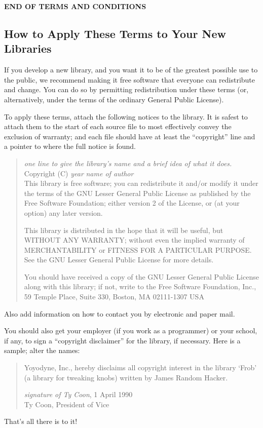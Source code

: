 \begin{center}\textbf{END OF TERMS AND CONDITIONS}\end{center}

\subsection*{How to Apply These Terms to Your New Libraries}

  If you develop a new library, and you want it to be of the greatest
possible use to the public, we recommend making it free software that
everyone can redistribute and change.  You can do so by permitting
redistribution under these terms (or, alternatively, under the terms of the
ordinary General Public License).

  To apply these terms, attach the following notices to the library.  It is
safest to attach them to the start of each source file to most effectively
convey the exclusion of warranty; and each file should have at least the
``copyright'' line and a pointer to where the full notice is found.

\begin{quote}
{\em one line to give the library's name and a brief idea of what it does.}\\
Copyright (C) {\em year} {\em name of author}\\

    This library is free software; you can redistribute it and/or
    modify it under the terms of the GNU Lesser General Public
    License as published by the Free Software Foundation; either
    version 2 of the License, or (at your option) any later version.

    This library is distributed in the hope that it will be useful,
    but WITHOUT ANY WARRANTY; without even the implied warranty of
    MERCHANTABILITY or FITNESS FOR A PARTICULAR PURPOSE\@.  See the GNU
    Lesser General Public License for more details.

    You should have received a copy of the GNU Lesser General Public
    License along with this library; if not, write to the Free Software
    Foundation, Inc., 59 Temple Place, Suite 330, Boston, MA  02111-1307  USA
\end{quote}

Also add information on how to contact you by electronic and paper mail.

You should also get your employer (if you work as a programmer) or your
school, if any, to sign a ``copyright disclaimer'' for the library, if
necessary.  Here is a sample; alter the names:

\begin{quote}
  Yoyodyne, Inc., hereby disclaims all copyright interest in the
  library `Frob' (a library for tweaking knobs) written by James Random Hacker.

  {\em signature of Ty Coon}, 1 April 1990\\
  Ty Coon, President of Vice
\end{quote}

That's all there is to it!
